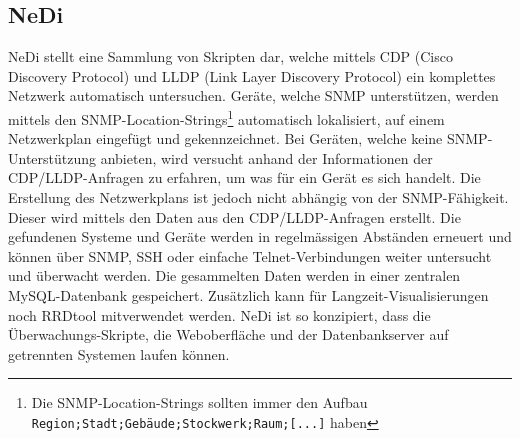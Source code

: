 \subsection{NeDi} \label{sec:systeme-nedi}  
  NeDi\cite{nedi} stellt eine Sammlung von Skripten dar, welche mittels CDP (Cisco Discovery Protocol) und LLDP (Link Layer Discovery Protocol) ein komplettes Netzwerk automatisch untersuchen. Ger\"ate, welche SNMP unterst\"utzen, werden mittels den SNMP-Location-Strings\footnote{\label{foot:nedi-snmp-str}Die SNMP-Location-Strings sollten immer den Aufbau \texttt{Region;Stadt;Geb\"aude;Stockwerk;Raum;[...]} haben} automatisch lokalisiert, auf einem Netzwerkplan eingef\"ugt und gekennzeichnet. Bei Ger\"aten, welche keine SNMP-Unterst\"utzung anbieten, wird versucht anhand der Informationen der CDP/LLDP-Anfragen zu erfahren, um was f\"ur ein Ger\"at es sich handelt. Die Erstellung des Netzwerkplans ist jedoch nicht abh\"angig von der SNMP-F\"ahigkeit. Dieser wird mittels den Daten aus den CDP/LLDP-Anfragen erstellt. Die gefundenen Systeme und Ger\"ate werden in regelm\"assigen Abst\"anden erneuert und k\"onnen \"uber SNMP, SSH oder einfache Telnet-Verbindungen weiter untersucht und \"uberwacht werden. Die gesammelten Daten werden in einer zentralen MySQL-Datenbank gespeichert. Zus\"atzlich kann f\"ur Langzeit-Visualisierungen noch RRDtool mitverwendet werden. NeDi ist so konzipiert, dass die \"Uberwachungs-Skripte, die Weboberfl\"ache und der Datenbankserver auf getrennten Systemen laufen k\"onnen.

